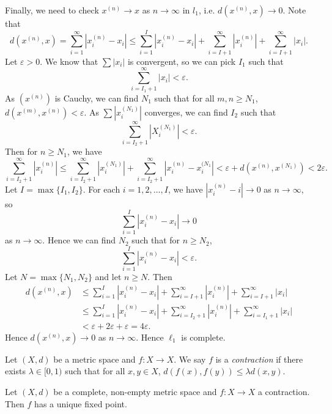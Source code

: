 \documentclass[12pt]{article}
\begin{document}
\begin{exbox}
	Finally, we need to check $x^{(n)} \to x$ as $n \to \infty$ in $l_1$, i.e. $d(x^{(n)}, x) \to 0$.
		Note that
		\[
			d(x^{(n)}, x) = \sum_{i = 1}^{\infty} |x_i^{(n)} - x_i| \leq \sum_{i = 1}^{I} |x_i^{(n)} - x_i| + \sum_{i = I+1}^{\infty}|x_i^{(n)}| + \sum_{i = I+1}^{\infty}|x_i|
		.\]
		Let $\varepsilon > 0$. We know that $\sum |x_i|$ is convergent, so we can pick $I_1$ such that 
		\[
		\sum_{i = I_1 + 1}^{\infty}|x_i| < \varepsilon
		.\]
		As $(x^{(n)})$ is Cauchy, we can find $N_1$ such that for all $m, n \geq N_1$, $d(x^{(m)}, x^{(n)}) < \varepsilon$. As $\sum |x_i^{(N_1)}|$ converges, we can find $I_2$ such that
		\[
			\sum_{i = I_2 + 1}^{\infty} |X_i^{(N_1)}| < \varepsilon
		.\]
		Then for $n \geq N_1$, we have
		\[
			\sum_{i = I_2 + 1}^{\infty}|x_i^{(n)}| \leq \sum_{i = I_2 + 1}^{\infty}|x_i^{(N_1)}| + \sum_{i = I_2 + 1}^{\infty}|x_i^{(n)} - x_i^{(N_1}| < \varepsilon + d(x^{(n)}, x^{(N_1)}) < 2 \varepsilon
		.\]
		Let $I = \max\{I_1, I_2\}$. For each $i = 1, 2, \ldots, I$, we have $|x_i^{(n)} - i| \to 0$ as $n \to \infty$, so
		\[
			\sum_{i = 1}^{I}|x_i^{(n)} - x_i| \to 0
		\]
		as $n \to \infty$. Hence we can find $N_2$ such that for $n \geq N_2$,
		\[
			\sum_{i = 1}^{I}|x_i^{(n)} - x_i| < \varepsilon
		.\]
		Let $N = \max\{N_1, N_2\}$ and let $n \geq N$. Then
		\begin{align*}
			d(x^{(n)}, x) &\leq \sum_{i = 1}^{I}|x_i^{(n)} - x_i| + \sum_{i = I+1}^{\infty}|x_i^{(n)}| + \sum_{i = I+1}^{\infty}|x_i| \\
				      &\leq \sum_{i = 1}^{I}|x_i^{(n)} - x_i| + \sum_{i = I_2 + 1}^{\infty}|x_i^{(n)}| + \sum_{i = I_1 + 1}^{\infty}|x_i| \\
				      &< \varepsilon + 2\varepsilon + \varepsilon = 4\varepsilon.
		\end{align*}
		Hence $d(x^{(n)}, x) \to 0$ as $n \to \infty$. Hence $\ell_1$ is complete.
\end{exbox}

\begin{definition}
	Let $(X, d)$ be a metric space and $f : X \to X$. We say $f$ is a \textit{contraction} if there exists $\lambda \in [0, 1)$ such that for all $x,y \in X$, $d(f(x), f(y)) \leq \lambda d(x, y)$.
\end{definition}

\begin{theorem}
	Let $(X, d)$ be a complete, non-empty metric space and $f : X \to X$ a contraction. Then $f$ has a unique fixed point.
\end{theorem}
\end{document}
